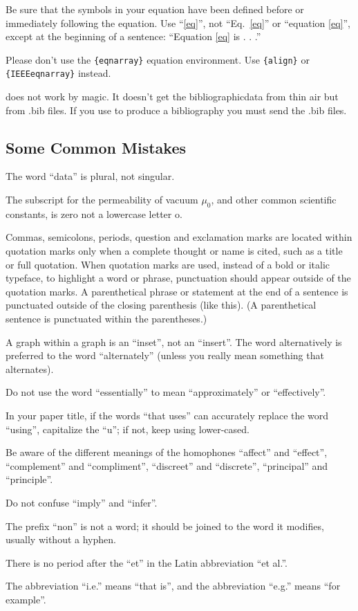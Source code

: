 Be sure that the symbols in your equation have been defined before or immediately following the equation. 
Use ``\eqref{eq}'', not ``Eq.~\eqref{eq}'' or ``equation \eqref{eq}'', except at the beginning of a sentence: ``Equation \eqref{eq} is . . .''

Please don't use the \verb|{eqnarray}| equation environment. Use \verb|{align}| or \verb|{IEEEeqnarray}| instead.

{\BibTeX} does not work by magic. It doesn't get the bibliographicdata from thin air but from .bib files. 
If you use {\BibTeX} to produce a bibliography you must send the .bib files. 

\subsection{Some Common Mistakes}\label{SCM}
The word ``data'' is plural, not singular.

The subscript for the permeability of vacuum $\mu_{0}$, and other common scientific constants, is zero not a lowercase letter o.

Commas, semicolons, periods, question and exclamation marks are located within quotation marks only when a complete thought or name is cited, such as a title or full quotation. 
When quotation marks are used, instead of a bold or italic typeface, to highlight a word or phrase, punctuation should appear outside of the quotation marks. 
A parenthetical phrase or statement at the end of a sentence is punctuated outside of the closing parenthesis (like this). (A parenthetical sentence is punctuated within the parentheses.)

A graph within a graph is an ``inset'', not an ``insert''. The word alternatively is preferred to the word ``alternately'' (unless you really mean something that alternates).

Do not use the word ``essentially'' to mean ``approximately'' or ``effectively''.

In your paper title, if the words ``that uses'' can accurately replace the word ``using'', capitalize the ``u''; if not, keep using lower-cased.

Be aware of the different meanings of the homophones ``affect'' and ``effect'', ``complement'' and ``compliment'', ``discreet'' and ``discrete'', ``principal'' and ``principle''.

Do not confuse ``imply'' and ``infer''.

The prefix ``non'' is not a word; it should be joined to the word it modifies, usually without a hyphen.

There is no period after the ``et'' in the Latin abbreviation ``et al.''.

The abbreviation ``i.e.'' means ``that is'', and the abbreviation ``e.g.'' means ``for example''.